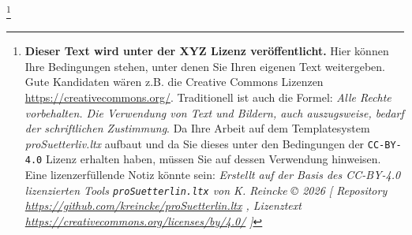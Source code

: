
\footnote{\textbf{Dieser Text wird unter der XYZ Lizenz veröffentlicht.}
Hier können Ihre Bedingungen stehen, unter denen Sie Ihren eigenen Text weitergeben.
Gute Kandidaten wären z.B. die Creative Commons Lizenzen
\href{https://creativecommons.org/}{https://creativecommons.org/}. Traditionell ist auch die Formel: \emph{Alle Rechte vorbehalten. Die Verwendung von Text und Bildern, auch auszugsweise, bedarf der schriftlichen Zustimmung}. \newline
Da Ihre Arbeit auf dem Templatesystem \textit{proSuetterliv.ltx} aufbaut und da Sie dieses unter den Bedingungen der \texttt{CC-BY-4.0} Lizenz erhalten haben, müssen Sie auf dessen Verwendung hinweisen. Eine lizenzerfüllende Notiz könnte sein:
\newline
\textit{Erstellt auf der Basis des CC-BY-4.0 lizenzierten Tools \texttt{proSuetterlin.ltx} von K. Reincke \copyright{} 2026 [
Repository \href{https://github.com/kreincke/proSuetterlin.ltx}{https://github.com/kreincke/proSuetterlin.ltx} ,
Lizenztext \href{https://creativecommons.org/licenses/by/4.0/}{https://creativecommons.org/licenses/by/4.0/} ]
}}
